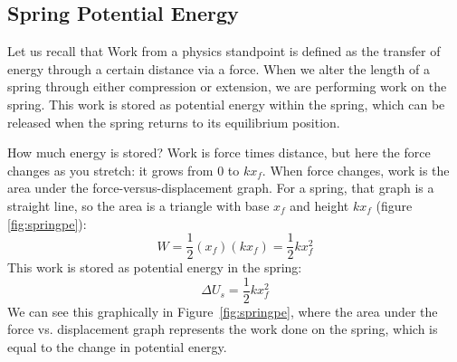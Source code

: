 \subsection{Spring Potential Energy}
 Let us recall that Work from a physics standpoint
is defined as the transfer of energy through a certain distance via a force.
When we alter the length of a spring through either compression or extension, we are
performing work on the spring. This work is stored as potential energy within
the spring, which can be released when the spring returns to its equilibrium position.

How much energy is stored? Work is force times distance, but here the
force changes as you stretch: it grows from 0 to $kx_f$. When force
changes, work is the area under the force-versus-displacement graph. For a
spring, that graph is a straight line, so the area is a triangle with base
$x_f$ and height $kx_f$ (figure \ref{fig:springpe}):
$$W = \frac{1}{2}(x_f)(kx_f) = \frac{1}{2}kx_f^2$$
This work is stored as potential energy in the spring:
\begin{equation}
	\Delta U_{s}= \frac{1}{2}k x_{f}^{2}\label{springpe}
\end{equation}
We can see this graphically in Figure~\ref{fig:springpe}, where the area under the
force vs. displacement graph represents the work done on the spring, which is equal
to the change in potential energy.

